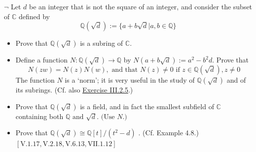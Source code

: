 \documentclass[12pt,letterpaper,boxed]{hmcpset}
\begin{document}
\begin{problem}[4.10]
	$\neg$ Let $d$ be an integer that is not the square of an integer, and consider the subset of $\mathbb{C}$ defined by 
	\[
	\mathbb{Q}(\sqrt{d}):=\{a+b \sqrt{d} | a, b \in \mathbb{Q}\}
	\]
	\begin{itemize}
		\item Prove that $\mathbb{Q}(\sqrt{d})$ is a subring of $\mathbb{C}$.
		\item Define a function $N: \mathbb{Q}(\sqrt{d}) \rightarrow \mathbb{Q}$ by $N(a+b \sqrt{d}):=a^{2}-b^{2} d .$ Prove that
		\[
		N(z w)=N(z) N(w), \text { and that } N(z) \neq 0 \text { if } z \in \mathbb{Q}(\sqrt{d}), z \neq 0
		\]
		The function $N$ is a `norm'; it is very useful in the study of $\mathbb{Q}(\sqrt{d})$ and of its subrings. (Cf. also \hyperlink{Exercise III.2.5}{Exercise III.2.5}.)
		\item Prove that $\mathbb{Q}(\sqrt{d})$ is a field, and in fact the smallest subfield of $\mathbb{C}$ containing both $\mathbb{Q} \text { and } \sqrt{d} . \text { (Use } N .)$
		\item Prove that $\mathbb{Q}(\sqrt{d})\cong \mathbb{Q}[t] /\left(t^{2}-d\right)$ . (Cf. Example 4.8.)\\
		$[\mathrm{V} .1 .17, \mathrm{V} .2 .18, \mathrm{V} .6 .13, \mathrm{VII} .1 .12]$
	\end{itemize}	
\end{problem}
\end{document}
